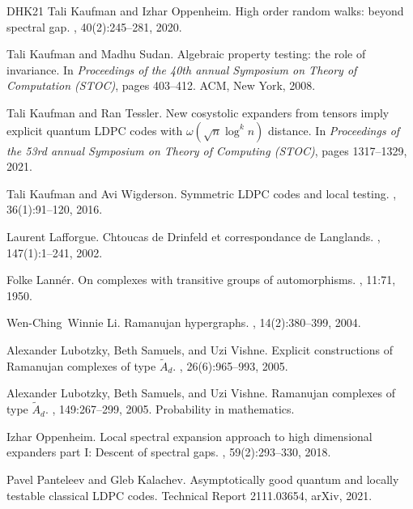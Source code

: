 \documentclass[10pt,a4paper]{article}
\theoremstyle{definition}
\begin{document}
\begin{thebibliography}{DHK{\etalchar{+}}21}
Tali Kaufman and Izhar Oppenheim.
\newblock High order random walks: beyond spectral gap.
, 40(2):245--281, 2020.

Tali Kaufman and Madhu Sudan.
\newblock Algebraic property testing: the role of invariance.
\newblock In {\em Proceedings of the 40th annual Symposium on Theory of
  Computation (STOC)}, pages 403--412. ACM, New York, 2008.

Tali Kaufman and Ran Tessler.
\newblock New cosystolic expanders from tensors imply explicit quantum {LDPC}
  codes with $\omega(\sqrt{n} \log^k n)$ distance.
\newblock In {\em Proceedings of the 53rd annual Symposium on Theory of
  Computing (STOC)}, pages 1317--1329, 2021.

Tali Kaufman and Avi Wigderson.
\newblock Symmetric {LDPC} codes and local testing.
, 36(1):91--120, 2016.

Laurent Lafforgue.
\newblock Chtoucas de {D}rinfeld et correspondance de {L}anglands.
, 147(1):1--241, 2002.

Folke Lann{\'e}r.
\newblock On complexes with transitive groups of automorphisms.
, 11:71, 1950.

Wen-Ching~Winnie Li.
\newblock Ramanujan hypergraphs.
, 14(2):380--399, 2004.

Alexander Lubotzky, Beth Samuels, and Uzi Vishne.
\newblock Explicit constructions of {R}amanujan complexes of type
  {$\tilde{A}_d$}.
, 26(6):965--993, 2005.

Alexander Lubotzky, Beth Samuels, and Uzi Vishne.
\newblock Ramanujan complexes of type {$\tilde{A}_d$}.
, 149:267--299, 2005.
\newblock Probability in mathematics.

Izhar Oppenheim.
\newblock Local spectral expansion approach to high dimensional expanders part
  {I}: Descent of spectral gaps.
, 59(2):293--330, 2018.

Pavel Panteleev and Gleb Kalachev.
\newblock Asymptotically good quantum and locally testable classical {LDPC}
  codes.
\newblock Technical Report 2111.03654, arXiv, 2021.


\end{thebibliography}
\end{document}
